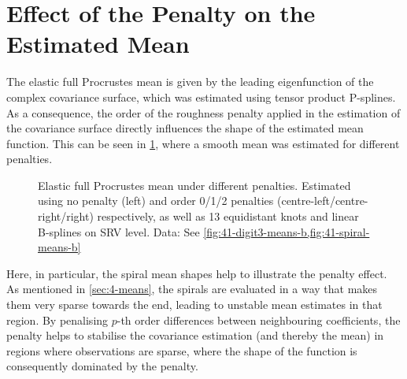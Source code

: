 \section{Effect of the Penalty on the Estimated Mean}
\label{sec:4-penalty}
The elastic full Procrustes mean is given by the leading eigenfunction of the complex covariance surface, which was estimated using tensor product P-splines.
As a consequence, the order of the roughness penalty applied in the estimation of the covariance surface directly influences the shape of the estimated mean function.
This can be seen in \cref{fig:4-penalty}, where a smooth mean was estimated for different penalties.
\begin{figure}
  \centering
  \begin{subfigure}{\textwidth}
  \end{subfigure}
  \begin{subfigure}{\textwidth}
  \end{subfigure}
  \caption{Elastic full Procrustes mean under different penalties.
  Estimated using no penalty (left) and order 0/1/2 penalties (centre-left/centre-right/right) respectively, as well as 13 equidistant knots and linear B-splines on SRV level.
  Data: See \cref{fig:41-digit3-means-b,fig:41-spiral-means-b}}
  \label{fig:4-penalty}
\end{figure}
Here, in particular, the spiral mean shapes help to illustrate the penalty effect.
As mentioned in \cref{sec:4-means}, the spirals are evaluated in a way that makes them very sparse towards the end, leading to unstable mean estimates in that region.
By penalising $p$-th order differences between neighbouring coefficients, the penalty helps to stabilise the covariance estimation (and thereby the mean) in regions where observations are sparse, where the shape of the function is consequently dominated by the penalty.

